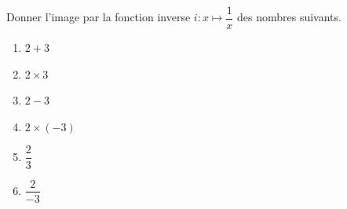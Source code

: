 \begin{exo}{}
	Donner l'image par la fonction inverse $i : x \mapsto \dfrac{1}{x}$ des nombres suivants.
	\vspace*{-2mm}
	\begin{multicols}{2}
		\begin{enumerate}
			\item $2 + 3$
			\item $2 \times 3$
			\item $2 - 3$
			\item $2 \times (-3)$
			\item $\dfrac{2}{3}$
			\item $\dfrac{2}{-3}$
		\end{enumerate}
	\end{multicols}\vspace*{-2mm}
\end{exo}
